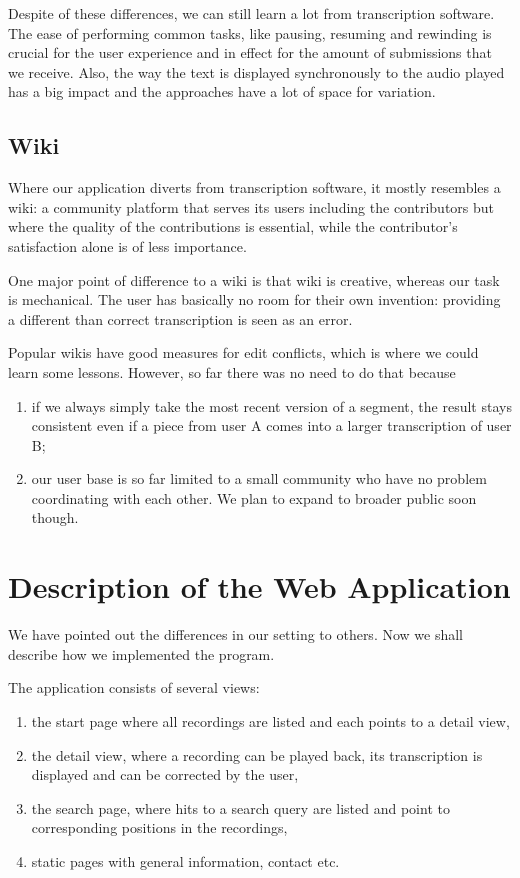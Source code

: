 \documentclass{svproc}
\begin{document}
\vspace{5mm}

Despite of these differences, we can still learn a lot from transcription
software. The ease of performing common tasks, like pausing, resuming and
rewinding is crucial for the user experience and in effect for the amount of
submissions that we receive. Also, the way the text is displayed synchronously
to the audio played has a big impact and the approaches have a lot of space for
variation.

\subsection{Wiki}

Where our application diverts from transcription software, it mostly resembles a
wiki: a community platform that serves its users including the contributors but
where the quality of the contributions is essential, while the contributor's
satisfaction alone is of less importance.

One major point of difference to a wiki is that wiki is creative, whereas our
task is mechanical. The user has basically no room for their own invention:
providing a different than correct transcription is seen as an error.

Popular wikis have good measures for edit conflicts, which is where we could
learn some lessons. However, so far there was no need to do that because
\begin{enumerate}
\item{if we always simply take the most recent version
of a segment, the result stays consistent even if a piece from user A comes into
a larger transcription of user B;}
\item{our user base is so far limited to a small community who have no problem
coordinating with each other. We plan to expand to broader public soon though.}
\end{enumerate}

\section{Description of the Web Application}

We have pointed out the differences in our setting to others. Now we shall
describe how we implemented the program.

The application consists of several views:
\begin{enumerate}
\item{the start page where all recordings are listed and each points to a detail
view,}
\item{the detail view, where a recording can be played back, its transcription
is displayed and can be corrected by the user,}
\item{the search page, where hits to a search query are listed and point to
corresponding positions in the recordings,}
\item{static pages with general information, contact etc.}
\end{enumerate}
\end{document}
